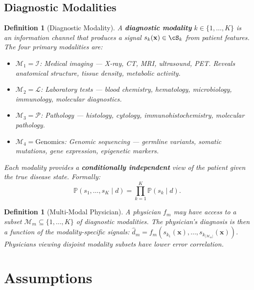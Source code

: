\documentclass[11pt,a4paper]{article}
\newtheorem{definition}[theorem]{Definition}
\theoremstyle{definition}
\newcommand{\Pbb}{\mathbb{P}}
\newcommand{\disease}{d}                       %
\newcommand{\diagnosis}{\hat{d}}               %
\newcommand{\modality}{\mathcal{M}}            %
\newcommand{\imaging}{\mathcal{I}}             %
\newcommand{\labtest}{\mathcal{L}}             %
\newcommand{\pathology}{\mathcal{P}}           %
\begin{document}
\subsection{Diagnostic Modalities}

\begin{definition}[Diagnostic Modality]
\label{def:modality}
A \textbf{diagnostic modality} $k \in \{1, \dots, K\}$ is an information channel
that produces a signal $s_k(\mathbf{x}) \in \cS_k$ from patient features.
The four primary modalities are:
\begin{itemize}[nosep]
    \item $\modality_1 = \imaging$: Medical imaging --- X-ray, CT, MRI, ultrasound, PET.
    Reveals anatomical structure, tissue density, metabolic activity.
    \item $\modality_2 = \labtest$: Laboratory tests --- blood chemistry, hematology,
    microbiology, immunology, molecular diagnostics.
    \item $\modality_3 = \pathology$: Pathology --- histology, cytology, immunohistochemistry,
    molecular pathology.
    \item $\modality_4 = \text{Genomics}$: Genomic sequencing --- germline variants,
    somatic mutations, gene expression, epigenetic markers.
\end{itemize}
Each modality provides a \textbf{conditionally independent} view of the patient
given the true disease state. Formally:
\begin{equation}\label{eq:modal_indep}
    \Pbb(s_1, \dots, s_K \mid \disease) = \prod_{k=1}^{K} \Pbb(s_k \mid \disease).
\end{equation}
\end{definition}

\begin{definition}[Multi-Modal Physician]
\label{def:multimodal_physician}
A physician $f_m$ may have access to a subset $\modality_m \subseteq \{1, \dots, K\}$
of diagnostic modalities. The physician's diagnosis is then a function of
the modality-specific signals: $\diagnosis_m = f_m(s_{k_1}(\mathbf{x}), \dots, s_{k_{|\modality_m|}}(\mathbf{x}))$.
Physicians viewing disjoint modality subsets have lower error correlation.
\end{definition}

\section{Assumptions}
\label{sec:assumptions}
\end{document}
